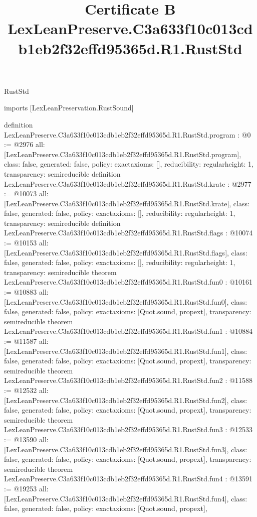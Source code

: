\begin{lexlean}{RustStd}
\title{Certificate B LexLeanPreserve.C3a633f10c013cdb1eb2f32effd95365d.R1.RustStd}
\begin{coremodule}
imports [LexLeanPreservation.RustSound]

definition LexLeanPreserve.C3a633f10c013cdb1eb2f32effd95365d.R1.RustStd.program : @0 := @2976 {
  all: [LexLeanPreserve.C3a633f10c013cdb1eb2f32effd95365d.R1.RustStd.program],
  class: false,
  generated: false,
  policy: exact{axioms: []},
  reducibility: regular{height: 1},
  transparency: semireducible
}
definition LexLeanPreserve.C3a633f10c013cdb1eb2f32effd95365d.R1.RustStd.krate : @2977 := @10073 {
  all: [LexLeanPreserve.C3a633f10c013cdb1eb2f32effd95365d.R1.RustStd.krate],
  class: false,
  generated: false,
  policy: exact{axioms: []},
  reducibility: regular{height: 1},
  transparency: semireducible
}
definition LexLeanPreserve.C3a633f10c013cdb1eb2f32effd95365d.R1.RustStd.flags : @10074 := @10153 {
  all: [LexLeanPreserve.C3a633f10c013cdb1eb2f32effd95365d.R1.RustStd.flags],
  class: false,
  generated: false,
  policy: exact{axioms: []},
  reducibility: regular{height: 1},
  transparency: semireducible
}
theorem LexLeanPreserve.C3a633f10c013cdb1eb2f32effd95365d.R1.RustStd.fun0 : @10161 := @10883 {
  all: [LexLeanPreserve.C3a633f10c013cdb1eb2f32effd95365d.R1.RustStd.fun0],
  class: false,
  generated: false,
  policy: exact{axioms: [Quot.sound, propext]},
  transparency: semireducible
}
theorem LexLeanPreserve.C3a633f10c013cdb1eb2f32effd95365d.R1.RustStd.fun1 : @10884 := @11587 {
  all: [LexLeanPreserve.C3a633f10c013cdb1eb2f32effd95365d.R1.RustStd.fun1],
  class: false,
  generated: false,
  policy: exact{axioms: [Quot.sound, propext]},
  transparency: semireducible
}
theorem LexLeanPreserve.C3a633f10c013cdb1eb2f32effd95365d.R1.RustStd.fun2 : @11588 := @12532 {
  all: [LexLeanPreserve.C3a633f10c013cdb1eb2f32effd95365d.R1.RustStd.fun2],
  class: false,
  generated: false,
  policy: exact{axioms: [Quot.sound, propext]},
  transparency: semireducible
}
theorem LexLeanPreserve.C3a633f10c013cdb1eb2f32effd95365d.R1.RustStd.fun3 : @12533 := @13590 {
  all: [LexLeanPreserve.C3a633f10c013cdb1eb2f32effd95365d.R1.RustStd.fun3],
  class: false,
  generated: false,
  policy: exact{axioms: [Quot.sound, propext]},
  transparency: semireducible
}
theorem LexLeanPreserve.C3a633f10c013cdb1eb2f32effd95365d.R1.RustStd.fun4 : @13591 := @19253 {
  all: [LexLeanPreserve.C3a633f10c013cdb1eb2f32effd95365d.R1.RustStd.fun4],
  class: false,
  generated: false,
  policy: exact{axioms: [Quot.sound, propext]},
}
\end{coremodule}
\end{lexlean}
